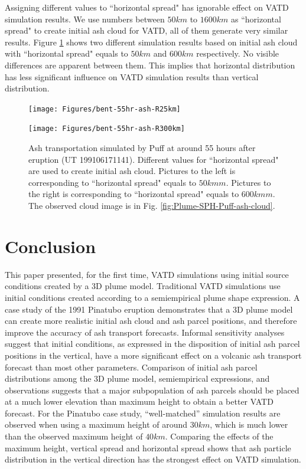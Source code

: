 \documentclass[draft,linenumbers]{agujournal2019}
\begin{document}
Assigning different values to ``horizontal spread" has ignorable effect on VATD simulation results. We use numbers between $50 km$ to $1600 km$ as ``horizontal spread" to create initial ash cloud for VATD, all of them generate very similar results. Figure \ref{fig:ash-distribution-horizontal-compare} shows two different simulation results based on initial ash cloud with ``horizontal spread" equals to $50 km$ and $600 km$ respectively. No visible differences are apparent between them. This implies that horizontal distribution has less significant influence on VATD simulation results than vertical distribution.

\begin{figure}[!htb]
\centering
    \begin{minipage}{.325 \textwidth}
        \centering
        \texttt{[image: Figures/bent-55hr-ash-R25km]}
    \end{minipage}%
    \begin{minipage}{.325 \textwidth}
        \centering
        \texttt{[image: Figures/bent-55hr-ash-R300km]}
    \end{minipage}%
    \caption{Ash transportation simulated by Puff at around 55 hours after eruption (UT 199106171141). Different values for ``horizontal spread" are used to create initial ash cloud. Pictures to the left is corresponding to ``horizontal spread" equals to $50 km m$. Pictures to the right is corresponding to ``horizontal spread" equals to $600 km m$. The observed cloud image is in Fig. \ref{fig:Plume-SPH-Puff-ash-cloud}.}
    \label{fig:ash-distribution-horizontal-compare}
\end{figure}

\section{Conclusion}

This paper presented, for the first time, VATD simulations using initial source conditions created by a 3D plume model.  Traditional VATD simulations use initial conditions created according to a semiempirical plume shape expression. A case study of the 1991 Pinatubo eruption demonstrates that a 3D plume model can create more realistic initial ash cloud and ash parcel positions, and therefore improve the accuracy of ash transport forecasts.  Informal sensitivity analyses suggest that initial conditions, as expressed in the disposition of initial ash parcel positions in the vertical, have a more significant effect on a volcanic ash transport forecast than most other parameters. Comparison of initial ash parcel distributions among the 3D plume model, semiempirical expressions, and observations suggests that a major subpopulation of ash parcels should be placed at a much lower elevation than maximum height to obtain a better VATD forecast. For the Pinatubo case study, ``well-matched'' simulation results are observed when using a maximum height of around $30 km$, which is much lower than the observed maximum height of $40 km$. Comparing the effects of the maximum height, vertical spread and horizontal spread shows that ash particle distribution in the vertical direction has the strongest effect on VATD simulation.
\end{document}
